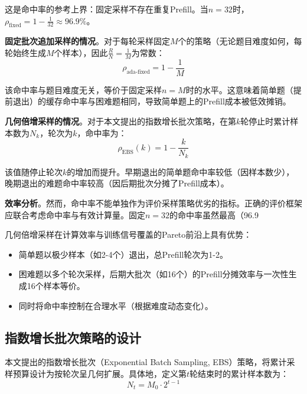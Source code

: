 这是命中率的参考上界：固定采样不存在重复Prefill。当$n = 32$时，$\rho_{\text{fixed}} = 1 - \frac{1}{32} \approx 96.9\%$。

\textbf{固定批次追加采样的情况}。对于每轮采样固定$M$个的策略（无论题目难度如何，每轮始终生成$M$个样本），因此$\frac{R}{N} = \frac{1}{M}$为常数：
\begin{equation}
\rho_{\text{ada-fixed}} = 1 - \frac{1}{M}
\label{eq:kv_cache_adaptive_fixed}
\end{equation}

该命中率与题目难度无关，等价于固定采样$n = M$时的水平。这意味着简单题（提前退出）的缓存命中率与困难题相同，导致简单题上的Prefill成本被低效摊销。

\textbf{几何倍增采样的情况}。对于本文提出的指数增长批次策略，在第$k$轮停止时累计样本数为$N_k$，轮次为$k$，命中率为：
\begin{equation}
\rho_{\text{EBS}}(k) = 1 - \frac{k}{N_k}
\label{eq:kv_cache_ebs}
\end{equation}

该值随停止轮次$k$的增加而提升。早期退出的简单题命中率较低（因样本数少），晚期退出的难题命中率较高（因后期批次分摊了Prefill成本）。

\textbf{效率分析}。然而，命中率不能单独作为评价采样策略优劣的指标。正确的评价框架应联合考虑命中率与有效计算量。固定$n = 32$的命中率虽然最高（96.9%

几何倍增采样在计算效率与训练信号覆盖的Pareto前沿上具有优势：
\begin{itemize}
    \item 简单题以极少样本（如2-4个）退出，总Prefill轮次为1-2。
    \item 困难题以多个轮次采样，后期大批次（如16个）的Prefill分摊效率与一次性生成16个样本等价。
    \item 同时将命中率控制在合理水平（根据难度动态变化）。
\end{itemize}

\subsection{指数增长批次策略的设计}
\label{subsec:ebs_design}

本文提出的指数增长批次（Exponential Batch Sampling, EBS）策略，将累计采样预算设计为按轮次呈几何扩展。具体地，定义第$t$轮结束时的累计样本数为：
\begin{equation}
N_t = M_0 \cdot 2^{t-1}
\label{eq:cumulative_samples}
\end{equation}

